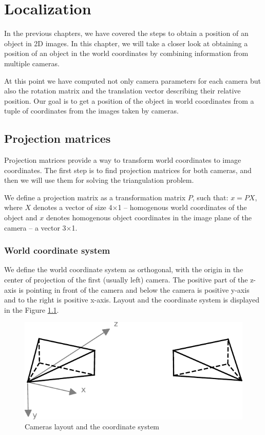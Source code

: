 \chapter{Localization}

In the previous chapters, we have covered the steps to obtain a position of
an object in 2D images. In this chapter, we will take a closer look at
obtaining a position of an object in the world coordinates by combining
information from multiple cameras.

At this point we have computed not only camera parameters for each camera but
also the rotation matrix and the translation vector describing their relative
position. Our goal is to get a position of the object in world coordinates from
a tuple of coordinates from the images taken by cameras.

\section{Projection matrices}
Projection matrices provide a way to transform world coordinates to image
coordinates. The first step is to find projection matrices for both
cameras, and then we will use them for solving the triangulation problem.

We define a projection matrix as a transformation matrix $P$, such that: $x = P
 X$, where $X$ denotes a vector of size 4$\times$1 -- homogenous world coordinates
of the object and $x$ denotes homogenous object coordinates in the image plane
of the camera -- a vector 3$\times$1.

\subsection{World coordinate system}
We define the world coordinate system as orthogonal, with the origin in the
center of projection of the first (usually left) camera. The positive part of
the z-axis is pointing in front of the camera and below the camera is positive
y-axis and to the right is positive x-axis. Layout and the coordinate system is
displayed in the Figure \ref{fig:coordinate-system}.

\begin{figure}
\centering
\includegraphics{img/camera-positions}
\caption{Cameras layout and the coordinate system}
\label{fig:coordinate-system}
\end{figure}


